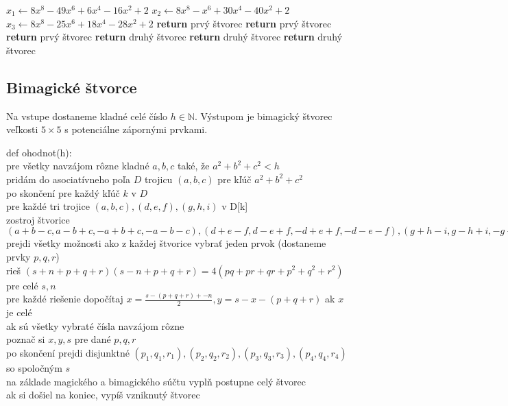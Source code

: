 \begin{algorithmic}
\STATE $x_1 \gets 8x^8 - 49x^6 + 6x^4 - 16x^2 + 2$
\STATE $x_2 \gets 8x^8 - x^6 + 30x^4 - 40x^2 + 2$
\STATE $x_3 \gets 8x^8 - 25x^6 + 18x^4 - 28x^2 + 2$
    \STATE \textbf{return} prvý štvorec
\ENDIF
{}
    \STATE \textbf{return} prvý štvorec
\ENDIF
{}
    \STATE \textbf{return} prvý štvorec
\ENDIF
{}
    \STATE \textbf{return} druhý štvorec
\ENDIF
{}
    \STATE \textbf{return} druhý štvorec
\ENDIF
{}
    \STATE \textbf{return} druhý štvorec
\ENDIF
\end{algorithmic}

\subsection{Bimagické štvorce}

\begin{subalg} Na vstupe dostaneme kladné celé číslo $h \in \mathbb{N}$. Výstupom je bimagický štvorec veľkosti $5 \times 5$ s potenciálne zápornými prvkami.
\end{subalg}

\begin{subcode}
def ohodnot(h): \\
pre všetky navzájom rôzne kladné $a,b,c$ také, že $a^2 + b^2 + c^2 < h$ \\
pridám do asociatívneho poľa $D$ trojicu $(a,b,c)$ pre kľúč $a^2+b^2+c^2$ \\
po skončení pre každý kľúč $k$ v $D$ \\
pre každé tri trojice $(a,b,c), (d,e,f), (g,h,i)$ v D[k] \\
zostroj štvorice $(a+b-c, a-b+c, -a+b+c, -a-b-c), (d+e-f, d-e+f, -d+e+f, -d-e-f), (g+h-i,g-h+i,-g+h+i,-g-h-i)$ \\
prejdi všetky možnosti ako z každej štvorice vybrať jeden prvok (dostaneme prvky $p,q,r$) \\
rieš $(s+n+p+q+r)(s-n+p+q+r) = 4(pq + pr + qr + p^2 + q^2 + r^2)$ pre celé $s,n$ \\
pre každé riešenie dopočítaj $x = \frac{s - (p+q+r) +- n}{2}, y = s - x - (p+q+r)$ ak $x$ je celé \\
ak sú všetky vybraté čísla navzájom rôzne \\
poznač si $x,y,s$ pre dané $p,q,r$ \\
po skončení prejdi disjunktné $(p_1,q_1,r_1), (p_2,q_2,r_2), (p_3,q_3,r_3), (p_4,q_4,r_4)$ so spoločným $s$ \\
na základe magického a bimagického súčtu vyplň postupne celý štvorec \\
ak si došiel na koniec, vypíš vzniknutý štvorec
\end{subcode}

